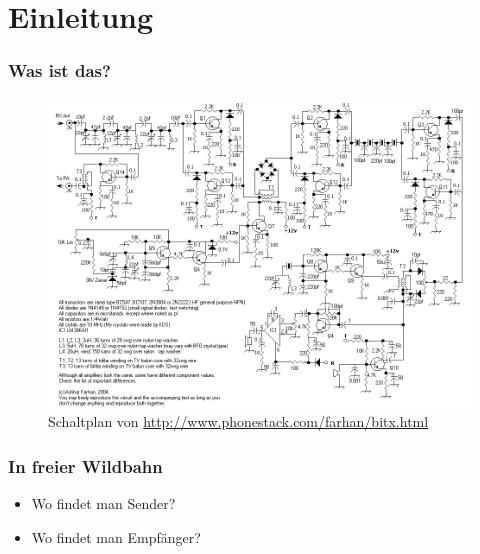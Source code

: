 

\subtitle{Technik 15: \\
  Sender- und Empfängertechnik \\[2em]}
\date{Stand 18.09.2017}


\section*{Einleitung}

\begin{frame}
  \frametitle{Was ist das?}
  \begin{center}
    \begin{figure}
      \includegraphics[width=.95\textwidth,height=.75\textheight,keepaspectratio]{e15/bitx.png}
      \caption{Schaltplan von \ExternalLink\url{http://www.phonestack.com/farhan/bitx.html}}
    \end{figure}
  \end{center}
\end{frame}

\begin{frame}
  \frametitle{In freier Wildbahn}
  \begin{itemize}
    \item Wo findet man Sender?
    \item Wo findet man Empfänger?
  \end{itemize}
\end{frame}

